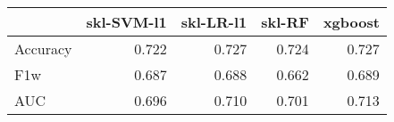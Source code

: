\begin{tabular}{lrrrr}
\toprule
{} &  skl-SVM-l1 &  skl-LR-l1 &  skl-RF &  xgboost \\
\midrule
Accuracy &       0.722 &      0.727 &   0.724 &    0.727 \\
F1w      &       0.687 &      0.688 &   0.662 &    0.689 \\
AUC      &       0.696 &      0.710 &   0.701 &    0.713 \\
\bottomrule
\end{tabular}
